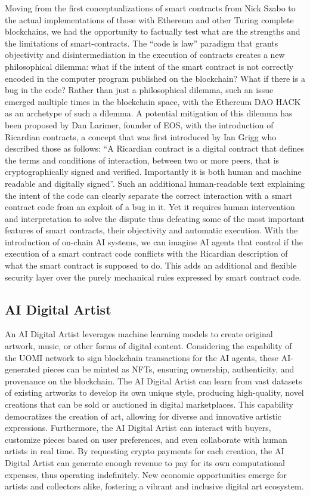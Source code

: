 \documentclass{article}
\begin{document}
Moving from the first conceptualizations of smart contracts from Nick Szabo to the actual implementations of those with Ethereum and other Turing complete blockchains, we had the opportunity to factually test what are the strengths and the limitations of smart-contracts. The “code is law” paradigm that grants objectivity and disintermediation in the execution of contracts creates a new philosophical dilemma: what if the intent of the smart contract is not correctly encoded in the computer program published on the blockchain? What if there is a bug in the code? Rather than just a philosophical dilemma, such an issue emerged multiple times in the blockchain space, with the Ethereum DAO HACK as an archetype of such a dilemma. A potential mitigation of this dilemma has been proposed by Dan Larimer, founder of EOS, with the introduction of Ricardian contracts, a concept that was first introduced by Ian Grigg who described those as follows: “A Ricardian contract is a digital contract that defines the terms and conditions of interaction, between two or more peers, that is cryptographically signed and verified. Importantly it is both human and machine readable and digitally signed”. Such an additional human-readable text explaining the intent of the code can clearly separate the correct interaction with a smart contract code from an exploit of a bug in it. Yet it requires human intervention and interpretation to solve the dispute thus defeating some of the most important features of smart contracts, their objectivity and automatic execution. With the introduction of on-chain AI systems, we can imagine AI agents that control if the execution of a smart contract code conflicts with the Ricardian description of what the smart contract is supposed to do. This adds an additional and flexible security layer over the purely mechanical rules expressed by smart contract code. 


\subsection{AI Digital Artist}

An AI Digital Artist leverages machine learning models to create original artwork, music, or other forms of digital content. Considering the capability of the UOMI network to sign blockchain transactions for the AI agents, these AI-generated pieces can be minted as NFTs, ensuring ownership, authenticity, and provenance on the blockchain. The AI Digital Artist can learn from vast datasets of existing artworks to develop its own unique style, producing high-quality, novel creations that can be sold or auctioned in digital marketplaces. This capability democratizes the creation of art, allowing for diverse and innovative artistic expressions. Furthermore, the AI Digital Artist can interact with buyers, customize pieces based on user preferences, and even collaborate with human artists in real time. By requesting crypto payments for each creation, the AI Digital Artist can generate enough revenue to pay for its own computational expenses, thus operating indefinitely. New economic opportunities emerge for artists and collectors alike, fostering a vibrant and inclusive digital art ecosystem. 
\end{document}
